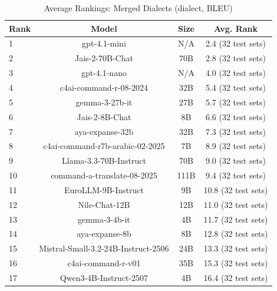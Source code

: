 \begin{table}[htbp]
\centering
\caption{Average Rankings: Merged Dialects (dialect, BLEU)}
\label{tab:avg_rankings_bleu_dialect}
\begin{tabular}{l@{\hspace{3pt}}c@{\hspace{3pt}}c@{\hspace{3pt}}c}
\toprule
Rank & Model & Size & Avg. Rank \\
\midrule
1 & gpt-4.1-mini & N/A & 2.4 (32 test sets) \\
2 & Jais-2-70B-Chat & 70B & 2.8 (32 test sets) \\
3 & gpt-4.1-nano & N/A & 4.0 (32 test sets) \\
4 & c4ai-command-r-08-2024 & 32B & 5.4 (32 test sets) \\
5 & gemma-3-27b-it & 27B & 5.7 (32 test sets) \\
6 & Jais-2-8B-Chat & 8B & 6.6 (32 test sets) \\
7 & aya-expanse-32b & 32B & 7.3 (32 test sets) \\
8 & c4ai-command-r7b-arabic-02-2025 & 7B & 8.9 (32 test sets) \\
9 & Llama-3.3-70B-Instruct & 70B & 9.0 (32 test sets) \\
10 & command-a-translate-08-2025 & 111B & 9.4 (32 test sets) \\
11 & EuroLLM-9B-Instruct & 9B & 10.8 (32 test sets) \\
12 & Nile-Chat-12B & 12B & 11.0 (32 test sets) \\
13 & gemma-3-4b-it & 4B & 11.7 (32 test sets) \\
14 & aya-expanse-8b & 8B & 12.8 (32 test sets) \\
15 & Mistral-Small-3.2-24B-Instruct-2506 & 24B & 13.3 (32 test sets) \\
16 & c4ai-command-r-v01 & 35B & 15.3 (32 test sets) \\
17 & Qwen3-4B-Instruct-2507 & 4B & 16.4 (32 test sets) \\
\bottomrule
\end{tabular}
\end{table}